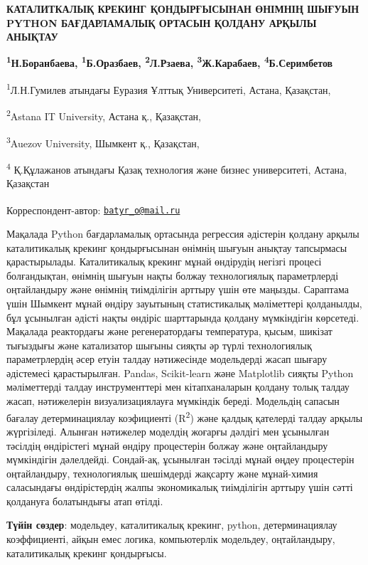
{\bfseries КАТАЛИТКАЛЫҚ КРЕКИНГ ҚОНДЫРҒЫСЫНАН ӨНІМНІҢ ШЫҒУЫН PYTHON
БАҒДАРЛАМАЛЫҚ ОРТАСЫН ҚОЛДАНУ АРҚЫЛЫ АНЫҚТАУ}

{\bfseries \textsuperscript{1}Н.Боранбаева,
\textsuperscript{1}Б.Оразбаев\textsuperscript{\envelope },
\textsuperscript{2}Л.Рзаева, \textsuperscript{3}Ж.Карабаев,
\textsuperscript{4}Б.Серимбетов}

\textsuperscript{1}Л.Н.Гумилев атындағы Еуразия Ұлттық Университеті,
Астана, Қазақстан,

\textsuperscript{2}Astana IT University, Астана қ., Қазақстан,

\textsuperscript{3}Auezov University, Шымкент қ., Қазақстан,

\textsuperscript{4} Қ.Құлажанов атындағы Қазақ технология және бизнес
университеті, Астана, Қазақстан

{\bfseries \textsuperscript{\envelope }}Корреспондент-автор:
\href{mailto:batyr_o@mail.ru}{\nolinkurl{batyr\_o@mail.ru}}

Мақалада Python бағдарламалық ортасында регрессия әдістерін қолдану
арқылы каталитикалық крекинг қондырғысынан өнімнің шығуын анықтау
тапсырмасы қарастырылады. Каталитикалық крекинг мұнай өндірудің негізгі
процесі болғандықтан, өнімнің шығуын нақты болжау технологиялық
параметрлерді оңтайландыру және өнімнің тиімділігін арттыру үшін өте
маңызды. Сараптама үшін Шымкент мұнай өндіру зауытының статистикалық
мәліметтері қолданылды, бұл ұсынылған әдісті нақты өндіріс шарттарында
қолдану мүмкіндігін көрсетеді. Мақалада реактордағы және регенератордағы
температура, қысым, шикізат тығыздығы және катализатор шығыны сияқты әр
түрлі технологиялық параметрлердің әсер етуін талдау нәтижесінде
модельдерді жасап шығару әдістемесі қарастырылған. Pandas, Scikit-learn
және Matplotlib сияқты Python мәліметтерді талдау инструменттері мен
кітапханаларын қолдану толық талдау жасап, нәтижелерін визуализациялауға
мүмкіндік береді. Модельдің сапасын бағалау детерминациялау коэфициенті
(R\textsuperscript{2}) және қалдық қателерді талдау арқылы жүргізіледі.
Алынған нәтижелер моделдің жоғарғы дәлдігі мен ұсынылған тәсілдің
өндірістегі мұнай өндіру процестерін болжау және оңтайландыру
мүмкіндігін дәлелдейді. Сондай-ақ, ұсынылған тәсілді мұнай өңдеу
процестерін оңтайландыру, технологиялық шешімдерді жақсарту және
мұнай-химия саласындағы өндірістердің жалпы экономикалық тиімділігін
арттыру үшін сәтті қолдануға болатындығы атап өтілді.

{\bfseries Түйін сөздер}: модельдеу, каталитикалық крекинг, python,
детерминациялау коэффициенті, айқын емес логика, компьютерлік модельдеу,
оңтайландыру, каталитикалық крекинг қондырғысы.

